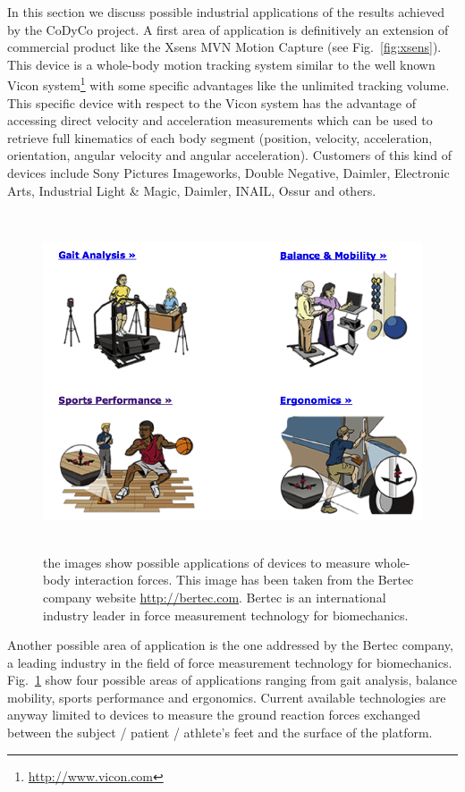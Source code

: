 \documentclass[12pt,a4paper,twoside]{article}
\begin{document}
In this section we discuss possible industrial applications of the results achieved by the CoDyCo project. A first area of application is definitively an extension of commercial product like the Xsens MVN Motion Capture (see Fig.~\ref{fig:xsens}). This device is a whole-body motion tracking system similar to the well known Vicon system\footnote{\url{http://www.vicon.com}} with some specific advantages like the unlimited tracking volume. This specific device with respect to the Vicon system has the advantage of accessing direct velocity and acceleration measurements which can be used to retrieve full kinematics of each body segment (position, velocity, acceleration, orientation, angular velocity and angular acceleration). Customers of this kind of devices include Sony Pictures Imageworks, Double Negative, Daimler, Electronic Arts, Industrial Light \& Magic, Daimler, INAIL, Ossur and others.


\begin{figure} 
\begin{center}
\includegraphics[height=10cm]{images/bertec.png}
\caption{the images show possible applications of devices to measure whole-body interaction forces. This image has been taken from the Bertec company website \protect\url{http://bertec.com}. Bertec is an international industry leader in force measurement technology for biomechanics.}\label{fig:bertec}
\end{center}
\end{figure}

Another possible area of application is the one addressed by the Bertec company, a leading industry in the field of force measurement technology for biomechanics. Fig.~\ref{fig:bertec} show four possible areas of applications ranging from gait analysis, balance mobility, sports performance and ergonomics. Current available technologies are anyway limited to devices to measure the ground reaction forces exchanged between the subject / patient / athlete’s feet and the surface of the platform. 
\end{document}

